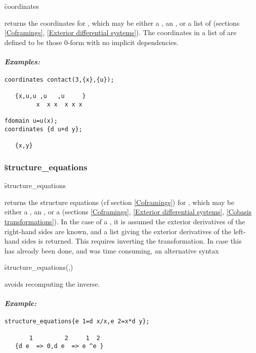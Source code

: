 \hypertarget{operator:COORDINATES}{}
\begin{syntax}
	\f{coordinates} 
\end{syntax}
returns the coordinates for , which may be either a
, an , or a list of  (sections
\ref{Coframings}, \ref{Exterior differential systems}). The coordinates in a
list of  are defined to be those 0-form  with no
implicit dependencies.

\paragraph{\textit{Examples:}}
\begin{verbatim}
coordinates contact(3,{x},{u});

   {x,u,u ,u   ,u     }
         x  x x  x x x

fdomain u=u(x);
coordinates {d u+d y};

   {x,y}
\end{verbatim}

\subsubsection{\f{structure\_equations}}
\label{structure_equations}

\hypertarget{operator:STRUCTURE_EQUATIONS}{}
\begin{syntax}
	\f{structure\_equations} 
\end{syntax}
returns the structure equations (cf section \ref{Coframings}) for
, which may be either a , an , or a
 (sections \ref{Coframings}, \ref{Exterior differential
systems}, \ref{Cobasis transformations}). In the case of a
, it is assumed the exterior derivatives of the right-hand
sides are known, and a list giving the exterior derivatives of the
left-hand sides is returned. This requires inverting the transformation. In
case this has already been done, and was time consuming, an alternative
syntax
\begin{syntax}
	\f{structure\_equations}(,)
\end{syntax}
avoids recomputing the inverse.

\paragraph{\textit{Example:}}
\begin{verbatim}
structure_equations{e 1=d x/x,e 2=x*d y};

       1         2     1  2
   {d e  => 0,d e  => e ^e }
\end{verbatim}

